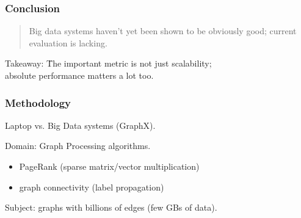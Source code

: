\documentclass[aspectratio=43]{beamer}
\newenvironment{changemargin}[1]{%
  \begin{list}{}{%
    \setlength{\topsep}{0pt}%
    \setlength{\leftmargin}{#1}%
    \setlength{\rightmargin}{1em}
    \setlength{\listparindent}{\parindent}%
    \setlength{\itemindent}{\parindent}%
    \setlength{\parsep}{\parskip}%
  }%
  \item[]}{\end{list}}
\begin{document}
\begin{frame}
  \frametitle{Conclusion}

\begin{quote}
Big data systems haven't yet been shown to be obviously good; current evaluation is lacking.
\end{quote}

  \begin{changemargin}{0.5cm}
\begin{tabbing}
Takeaway: \= The important metric is not just scalability;\\
\> absolute performance matters a lot too.
\end{tabbing}
  \end{changemargin}
\end{frame}


\begin{frame}
  \frametitle{Methodology}
  \begin{changemargin}{2cm}

Laptop vs. Big Data systems (GraphX).

Domain: Graph Processing algorithms.\\
\begin{itemize}
\item PageRank (sparse matrix/vector multiplication)
\item graph connectivity (label propagation)
\end{itemize}

Subject: graphs with billions of edges (few GBs of data).

  \end{changemargin}
\end{frame}
\end{document}
